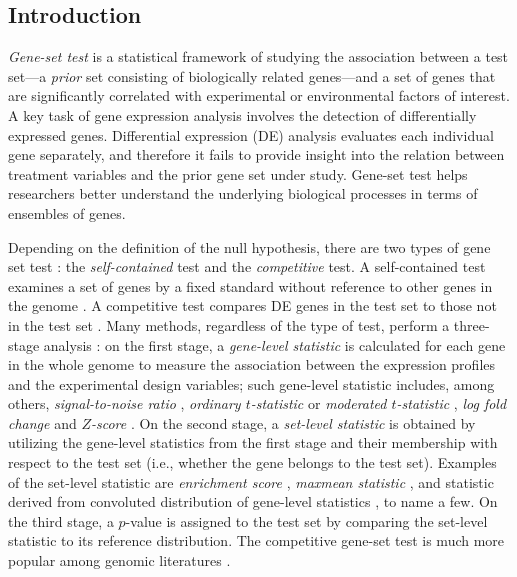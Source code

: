 	\subsection{Introduction}\label{section:introduction}
	
	\textit{Gene-set test} is a statistical framework of studying the association between a test
	set---a \textit{prior} set consisting of biologically related genes---and a set of genes that 
	are
	significantly correlated with experimental or environmental factors of interest. A key task of 
	gene expression analysis involves the detection of differentially expressed genes. Differential
	expression (DE) analysis  evaluates each individual gene separately, and therefore it fails to
	provide insight into the relation between treatment variables and the prior gene set under 
	study.
	Gene-set test helps researchers better understand the underlying biological processes in terms 
	of
	ensembles of genes.
	
	Depending on the definition of the null hypothesis, there are two types of gene set test
	\citep{goeman2007analyzing}: the \textit{self-contained} test and the \textit{competitive} 
	test. A
	self-contained test examines a set of genes by a fixed standard without reference to other 
	genes in
	the genome 
	\citep{goeman2005testing,goeman2004global,huang2013gene,tsai2009multivariate,wu2010roast}. A 
	competitive test compares DE genes in the test set to those not in the test set 
	\citep{tian2005discovering,wu2012camera,yaari2013quantitative}. Many methods, regardless of the 
	type of test, perform a three-stage analysis
	\citep{khatri2012ten}: on the first stage, a \textit{gene-level statistic} is calculated for 
	each
	gene in the whole genome to measure the association between the expression profiles and the
	experimental design variables; such gene-level statistic includes, among others,
	\textit{signal-to-noise ratio} \citep{subramanian2005gene}, \textit{ordinary $t$-statistic}
	\citep{tian2005discovering} or \textit{moderated $t$-statistic} \citep{Smyth2004moderated},
	\textit{log fold change} \citep{kim2005page} and \textit{$Z$-score} 
	\citep{efron2007correlation}. On
	the second stage, a \textit{set-level statistic} is obtained by utilizing the gene-level 
	statistics
	from the first stage and their membership with respect to the test set (i.e., whether the gene
	belongs to the test set). Examples of the set-level statistic are \textit{enrichment score}
	\citep{subramanian2005gene}, \textit{maxmean statistic} \citep{efron2007testing}, and statistic
	derived from convoluted distribution of gene-level statistics \citep{yaari2013quantitative}, to 
	name
	a few. On the third stage, a $p$-value is assigned to the test set by comparing the set-level
	statistic to its reference distribution. The competitive gene-set test is much more popular 
	among
	genomic literatures \citep{gatti2010heading,goeman2007analyzing}.  
	
